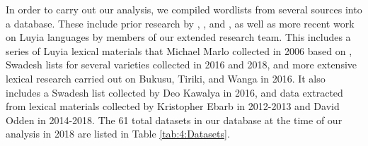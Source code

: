 \documentclass[output=paper]{langscibook}
\begin{document}
In order to carry out our analysis, we compiled wordlists from several sources into a database. These include prior research by \citet{brown_phonological_1972}, \citet{williams_lexico-statistical_1973}, and \citet{nurse_tanzania_1975}, as well as more recent work on Luyia languages by members of our extended research team. This includes a series of Luyia lexical materials that Michael Marlo collected in 2006 based on \citet{appleby_luluhya-english_1943}, Swadesh lists for several varieties collected in 2016 and 2018, and more extensive lexical research carried out on Bukusu, Tiriki, and Wanga in 2016. It also includes a Swadesh list collected by Deo Kawalya in 2016, and data extracted from lexical materials collected by Kristopher Ebarb in 2012-2013 and David Odden in 2014-2018. The 61 total datasets in our database at the time of our analysis in 2018 are listed in Table \ref{tab:4:Datasets}. 
\end{document}
